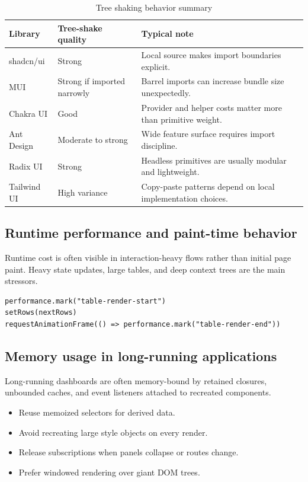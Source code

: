 \begin{table}[htbp]
  \centering
  \caption{Tree shaking behavior summary}
  \begin{tabularx}{\textwidth}{@{}p{}p{}Y@{}}
    \toprule
    \textbf{Library} & \textbf{Tree-shake quality} & \textbf{Typical note} \\
    \midrule
    shadcn/ui & Strong & Local source makes import boundaries explicit. \\
    MUI & Strong if imported narrowly & Barrel imports can increase bundle size unexpectedly. \\
    Chakra UI & Good & Provider and helper costs matter more than primitive weight. \\
    Ant Design & Moderate to strong & Wide feature surface requires import discipline. \\
    Radix UI & Strong & Headless primitives are usually modular and lightweight. \\
    Tailwind UI & High variance & Copy-paste patterns depend on local implementation choices. \\
    \bottomrule
  \end{tabularx}
\end{table}

\subsection{Runtime performance and paint-time behavior}
Runtime cost is often visible in interaction-heavy flows rather than initial page paint. Heavy state updates, large tables, and deep context trees are the main stressors.

\begin{verbatim}
performance.mark("table-render-start")
setRows(nextRows)
requestAnimationFrame(() => performance.mark("table-render-end"))
\end{verbatim}

\subsection{Memory usage in long-running applications}
Long-running dashboards are often memory-bound by retained closures, unbounded caches, and event listeners attached to recreated components.

\begin{itemize}[leftmargin=*, itemsep=0.35em]
  \item Reuse memoized selectors for derived data.
  \item Avoid recreating large style objects on every render.
  \item Release subscriptions when panels collapse or routes change.
  \item Prefer windowed rendering over giant DOM trees.
\end{itemize}

